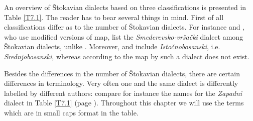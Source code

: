 An overview of Štokavian dialects based on three classifications is presented in Table \ref{T7.1}. The reader has to bear several things in mind. First of all classifications differ as to the number of Štokavian dialects. For instance \citet{IPR01} and \citet[160f]{Lisac03}, who use modified versions of \citet{Ivic88} map, list the \textit{Smederevsko-vršački} dialect among Štokavian dialects, unlike \citet[318f]{Okuka08}. Moreover, \citet[160f]{Lisac03} and \citet[318f]{Okuka08} include \textit{Istočnobosanski}, i.e. \textit{Srednjobosanski}, whereas according to the map by \citet{IPR01} such a dialect does not exist. 

Besides the differences in the number of Štokavian dialects, there are certain differences in terminology. Very often one and the same dialect is differently labelled by different authors: compare for instance the names for the \textit{Zapadni} dialect in Table \ref{T7.1} (page \pageref{T7.1}). Throughout this chapter we will use the terms which are in small caps format in the  table. 

